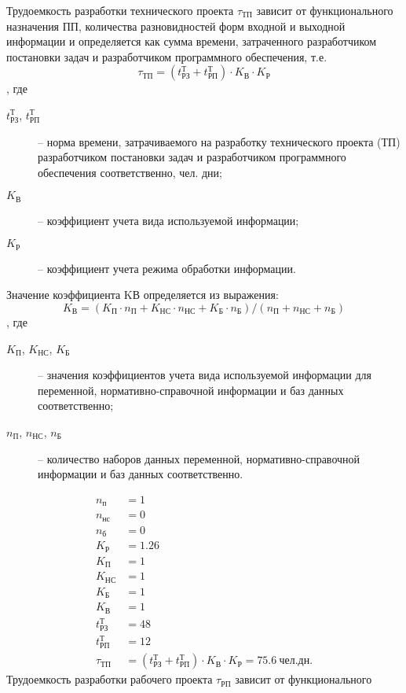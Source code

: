 \documentclass[a4paper,12pt]{article}\usepackage[]{graphicx}\usepackage[]{color}
\numberwithin{equation}{section}
\newcommand{\un}[1]{\: \mathit{#1}} %
\begin{document}
Трудоемкость разработки технического проекта $\tau_{ТП}$ зависит от
функционального назначения ПП, количества разновидностей форм входной и выходной
информации и определяется как сумма времени, затраченного разработчиком
постановки задач и разработчиком программного обеспечения, т.е.
\begin{equation}
  \tau_{ТП} = \left( t_{РЗ}^Т + t_{РП}^Т \right) \cdot K_В \cdot K_Р
\end{equation}
, где
\begin{description}
\item[$t_{РЗ}^Т$, $t_{РП}^Т$] -- норма времени, затрачиваемого на разработку
технического проекта (ТП) разработчиком постановки задач и разработчиком
программного обеспечения соответственно, чел. дни;
\item[$K_В$] -- коэффициент учета вида используемой информации; 
\item[$K_Р$] -- коэффициент учета режима обработки информации. 
\end{description}
Значение коэффициента KВ определяется из выражения:
\begin{equation}
  K_В = \left( K_П \cdot n_П + K_{НС} \cdot n_{НС} + K_Б \cdot n_Б \right) / \left( n_П + n_{НС} + n_Б \right) 
\end{equation}
, где
\begin{description}
  \item[$K_П$, $K_{НС}$, $K_Б$] -- значения коэффициентов учета вида
используемой информации для переменной, нормативно-справочной информации и баз
данных соответственно;
\item[$n_П$, $n_{НС}$, $n_Б$] -- количество наборов данных переменной,
нормативно-справочной информации и баз данных соответственно.
\end{description}
\begin{align*}
  n_п &= 1 \\
  n_{нс} &= 0 \\
  n_б &= 0 \\
  K_Р &= 1.26 \\
  K_П &= 1 \\
  K_{НС} &= 1 \\
  K_Б &= 1 \\
  K_В &= 1 \\
  t_{РЗ}^Т &= 48 \\
  t_{РП}^Т &= 12 \\
  \tau_{ТП} &= \left( t_{РЗ}^Т + t_{РП}^Т \right) \cdot K_В \cdot K_Р =
  75.6 \un{чел.дн.}
\end{align*}
Трудоемкость разработки рабочего проекта $\tau_{РП}$ зависит от функционального
\end{document}

